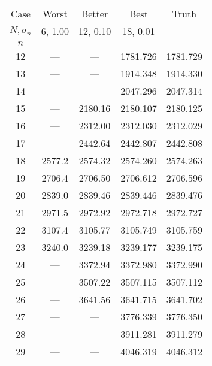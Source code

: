 \begin{tabular}{ccccc}
\toprule
Case & Worst & Better & Best & Truth \\
$N, \sigma_n$ & 6, 1.00 & 12, 0.10 & 18, 0.01 &  \\
$n$ &  &  &  &  \\
\midrule
12 & --- & --- & 1781.726 & 1781.729 \\
13 & --- & --- & 1914.348 & 1914.330 \\
14 & --- & --- & 2047.296 & 2047.314 \\
15 & --- & 2180.16 & 2180.107 & 2180.125 \\
16 & --- & 2312.00 & 2312.030 & 2312.029 \\
17 & --- & 2442.64 & 2442.807 & 2442.808 \\
18 & 2577.2 & 2574.32 & 2574.260 & 2574.263 \\
19 & 2706.4 & 2706.50 & 2706.612 & 2706.596 \\
20 & 2839.0 & 2839.46 & 2839.446 & 2839.476 \\
21 & 2971.5 & 2972.92 & 2972.718 & 2972.727 \\
22 & 3107.4 & 3105.77 & 3105.749 & 3105.759 \\
23 & 3240.0 & 3239.18 & 3239.177 & 3239.175 \\
24 & --- & 3372.94 & 3372.980 & 3372.990 \\
25 & --- & 3507.22 & 3507.115 & 3507.112 \\
26 & --- & 3641.56 & 3641.715 & 3641.702 \\
27 & --- & --- & 3776.339 & 3776.350 \\
28 & --- & --- & 3911.281 & 3911.279 \\
29 & --- & --- & 4046.319 & 4046.312 \\
\bottomrule
\end{tabular}

